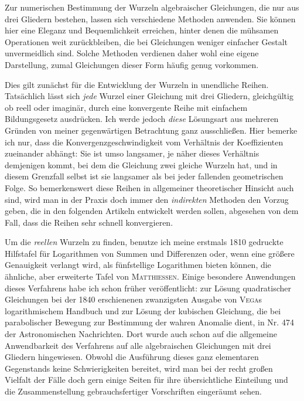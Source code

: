 Zur numerischen Bestimmung der Wurzeln algebraischer Gleichungen, die nur aus drei Gliedern bestehen, lassen sich verschiedene Methoden anwenden. Sie können hier eine Eleganz und Bequemlichkeit erreichen, hinter denen die mühsamen Operationen weit zurückbleiben, die bei Gleichungen weniger einfacher Gestalt unvermeidlich sind. Solche Methoden verdienen daher wohl eine eigene Darstellung, zumal Gleichungen dieser Form häufig genug vorkommen.

Dies gilt zunächst für die Entwicklung der Wurzeln in unendliche Reihen. Tatsächlich lässt sich \textit{jede} Wurzel einer Gleichung mit drei Gliedern, gleichgültig ob reell oder imaginär, durch eine konvergente Reihe mit einfachem Bildungsgesetz ausdrücken. Ich werde jedoch \textit{diese} Lösungsart aus mehreren Gründen von meiner gegenwärtigen Betrachtung ganz ausschließen. Hier bemerke ich nur, dass die Konvergenzgeschwindigkeit vom Verhältnis der Koeffizienten zueinander abhängt: Sie ist umso langsamer, je näher dieses Verhältnis demjenigen kommt, bei dem die Gleichung zwei gleiche Wurzeln hat, und in diesem Grenzfall selbst ist sie langsamer als bei jeder fallenden geometrischen Folge. So bemerkenswert diese Reihen in allgemeiner theoretischer Hinsicht auch sind, wird man in der Praxis doch immer den \textit{indirekten} Methoden den Vorzug geben, die in den folgenden Artikeln entwickelt werden sollen, abgesehen von dem Fall, dass die Reihen sehr schnell konvergieren.

Um die \textit{reellen} Wurzeln zu finden, benutze ich meine erstmals 1810 gedruckte Hilfstafel für Logarithmen von Summen und Differenzen oder, wenn eine größere Genauigkeit verlangt wird, als fünfstellige Logarithmen bieten können, die ähnliche, aber erweiterte Tafel von \textsc{Matthiessen}. Einige besondere Anwendungen dieses Verfahrens habe ich schon früher veröffentlicht: zur Lösung quadratischer Gleichungen bei der 1840 erschienenen zwanzigsten Ausgabe von \textsc{Vega}s logarithmischem Handbuch und zur Lösung der kubischen Gleichung, die bei parabolischer Bewegung zur Bestimmung der wahren Anomalie dient, in Nr. 474 der Astronomischen Nachrichten. Dort wurde auch schon auf die allgemeine Anwendbarkeit des Verfahrens auf alle algebraischen Gleichungen mit drei Gliedern hingewiesen. Obwohl die Ausführung dieses ganz elementaren Gegenstands keine Schwierigkeiten bereitet, wird man bei der recht großen Vielfalt der Fälle doch gern einige Seiten für ihre übersichtliche Einteilung und die Zusammenstellung gebrauchsfertiger Vorschriften eingeräumt sehen.

